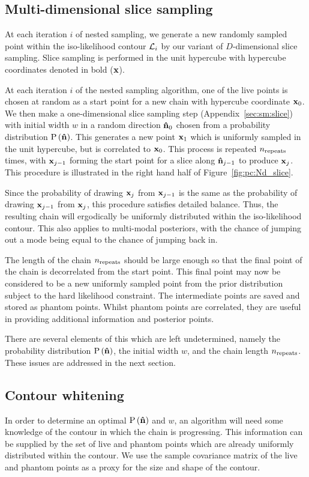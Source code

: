 \subsection{Multi-dimensional slice sampling}
\label{sec:pc:multi_slice}
At each iteration $i$ of nested sampling, we generate a new randomly sampled point within the iso-likelihood contour $\mathcal{L}_i$ by our variant of $D$-dimensional slice sampling.
Slice sampling is performed in the unit hypercube with hypercube coordinates denoted in bold ($\mathbf{x}$).

At each iteration $i$ of the nested sampling algorithm, one of the live points is chosen at random as a start point for a new chain with hypercube coordinate $\mathbf{x}_{0}$. We then make a one-dimensional slice sampling step (Appendix~\protect\ref{sec:sm:slice}) with initial width $w$ in a random direction $\mathbf{\hat{n}}_{0}$ chosen from a probability distribution $\mathrm{P}\left(\mathbf{\hat{n}}\right)$. This generates a new point $\mathbf{x}_{1}$ which is uniformly sampled in the unit hypercube, but is correlated to $\mathbf{x}_{0}$. This process is repeated $n_{\mathrm{repeats}}$ times, with $\mathbf{x}_{j-1}$ forming the start point for a slice along $\mathbf{\hat{n}}_{j-1}$ to produce $\mathbf{x}_{j}$. This procedure is illustrated in the right hand half of Figure~\ref{fig:pc:Nd_slice}.

Since the probability of drawing $\mathbf{x}_{j}$ from $\mathbf{x}_{j-1}$ is the same as the probability of drawing $\mathbf{x}_{j-1}$ from $\mathbf{x}_{j}$, this procedure satisfies detailed balance. Thus, the resulting chain will ergodically be uniformly distributed within the iso-likelihood contour. This also applies to multi-modal posteriors, with the chance of jumping out a mode being equal to the chance of jumping back in.

The length of the chain $n_{\mathrm{repeats}}$ should be large enough so that the final point of the chain is decorrelated from the start point. 
This final point may now be considered to be a new uniformly sampled point from the prior distribution subject to the hard likelihood constraint. The intermediate points are saved and stored as phantom points. Whilst phantom points are correlated, they are useful in providing additional information and posterior points.

There are several elements of this which are left undetermined, namely the probability distribution $\mathrm{P}\left(\mathbf{\hat{n}}\right)$, the initial width $w$, and the chain length $n_{\mathrm{repeats}}$. These issues are addressed in the next section.


\subsection{Contour whitening}
\label{sec:pc:cont_white}
In order to determine an optimal $\mathrm{P}\left(\mathbf{\hat{n}}\right)$ and $w$, an algorithm will need some knowledge of the contour in which the chain is progressing. This information can be supplied by the set of live and phantom points which are already uniformly distributed within the contour. We use the sample covariance matrix of the live and phantom points as a proxy for the size and shape of the contour.

